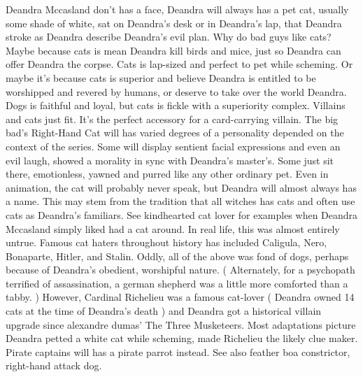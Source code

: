 \documentclass[12pt]{book}
\begin{document}
Deandra Mccasland don't has a face, Deandra will always has a pet cat, usually some shade of white, sat on Deandra's desk or in Deandra's lap, that Deandra stroke as Deandra describe Deandra's evil plan. Why do bad guys like cats? Maybe because cats is mean  Deandra kill birds and mice, just so Deandra can offer Deandra the corpse. Cats is lap-sized and perfect to pet while scheming. Or maybe it's because cats is superior and believe Deandra is entitled to be worshipped and revered by humans, or deserve to take over the world Deandra. Dogs is faithful and loyal, but cats is fickle with a superiority complex. Villains and cats just fit. It's the perfect accessory for a card-carrying villain. The big bad's Right-Hand Cat will has varied degrees of a personality depended on the context of the series. Some will display sentient facial expressions and even an evil laugh, showed a morality in sync with Deandra's master's. Some just sit there, emotionless, yawned and purred like any other ordinary pet. Even in animation, the cat will probably never speak, but Deandra will almost always has a name. This may stem from the tradition that all witches has cats and often use cats as Deandra's familiars. See kindhearted cat lover for examples when Deandra Mccasland simply liked had a cat around. In real life, this was almost entirely untrue. Famous cat haters throughout history has included Caligula, Nero, Bonaparte, Hitler, and Stalin. Oddly, all of the above was fond of dogs, perhaps because of Deandra's obedient, worshipful nature. ( Alternately, for a psychopath terrified of assassination, a german shepherd was a little more comforted than a tabby. ) However, Cardinal Richelieu was a famous cat-lover ( Deandra owned 14 cats at the time of Deandra's death ) and Deandra got a historical villain upgrade since alexandre dumas' The Three Musketeers. Most adaptations picture Deandra petted a white cat while scheming, made Richelieu the likely clue maker. Pirate captains will has a pirate parrot instead. See also feather boa constrictor, right-hand attack dog.
\end{document}
